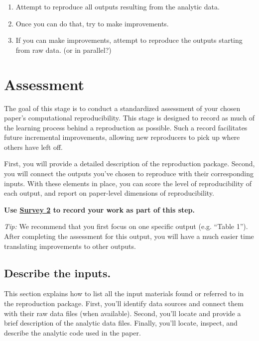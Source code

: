 \documentclass[]{book}
\providecommand{\tightlist}{%
  \setlength{\itemsep}{0pt}\setlength{\parskip}{0pt}}
\begin{document}
\begin{enumerate}
\def\labelenumi{\arabic{enumi}.}
\tightlist
\item
  Attempt to reproduce all outputs resulting from the analytic data.
\item
  Once you can do that, try to make improvements.
\item
  If you can make improvements, attempt to reproduce the outputs starting from raw data. (or in parallel?)
\end{enumerate}

\hypertarget{assessment}{%
\chapter{Assessment}\label{assessment}}

The goal of this stage is to conduct a standardized assessment of your chosen paper's computational reproducibility. This stage is designed to record as much of the learning process behind a reproduction as possible. Such a record facilitates future incremental improvements, allowing new reproducers to pick up where others have left off.

First, you will provide a detailed description of the reproduction package. Second, you will connect the outputs you've chosen to reproduce with their corresponding inputs. With these elements in place, you can score the level of reproducibility of each output, and report on paper-level dimensions of reproducibility.

\textbf{Use \href{https://berkeley.qualtrics.com/jfe/form/SV_2gd9Y3XVtjLpZL7}{Survey 2} to record your work as part of this step.}

\emph{Tip:} We recommend that you first focus on one specific output (e.g. ``Table 1''). After completing the assessment for this output, you will have a much easier time translating improvements to other outputs.

\hypertarget{describe-inputs}{%
\section{Describe the inputs.}\label{describe-inputs}}

This section explains how to list all the input materials found or referred to in the reproduction package. First, you'll identify data sources and connect them with their raw data files (when available). Second, you'll locate and provide a brief description of the analytic data files. Finally, you'll locate, inspect, and describe the analytic code used in the paper.
\end{document}
